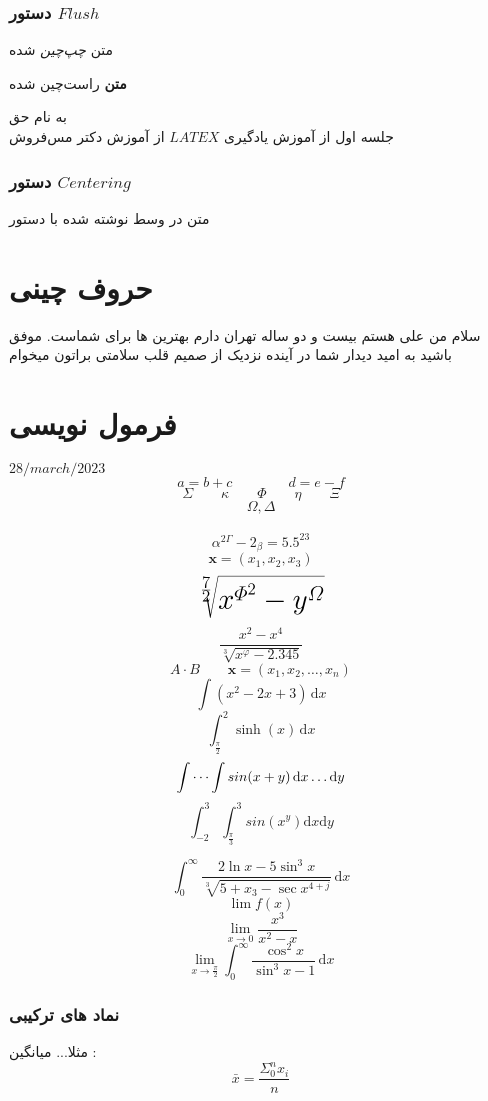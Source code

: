 \documentclass[12pt]{book}
\begin{document}
\subsection{دستور $Flush$}
\begin{flushleft}
	متن \textit{چپ‌چین} شده
\end{flushleft}

\begin{flushright}
	\textbf{متن} راست‌چین شده
\end{flushright}

به نام حق \\
جلسه اول از آموزش یادگیری $LATEX$ از آموزش دکتر مس‌فروش

\subsection{دستور $Centering$}
\centering
متن در وسط نوشته شده با دستور 

\chapter{حروف چینی}\label{chap3}
\begin{multicols}{2}
	
	\shapepar{\hexagonshape}
سلام من علی هستم بیست و دو ساله تهران دارم بهترین ها برای شماست. موفق باشید به امید دیدار شما در آینده نزدیک از صمیم قلب سلامتی براتون میخوام
\end{multicols}
\chapter{فرمول نویسی}\label{chap4}

$28 /march/ 2023$
\[
a = b + c \qquad \qquad d  = e - f 
\]
\[
\Sigma \qquad \kappa \qquad \Phi \qquad \eta \qquad \Xi
\]
\[
\boldsymbol{\varOmega, \varDelta}
\]
\\
\[
\alpha^{2\varGamma} - 2_{\beta} = 5.5^{23}
\]
\[
\mathbf{x} = (x_1,x_2,x_3)
\]
\[
\huge{\sqrt[\frac72]{x^{\varPhi^{2}} - y^\varOmega}}
\]
\[
\frac{x^2 - x^4}{\sqrt[3]{x^\varphi - 2.345}}
\]
\[
A \cdot B \qquad \mathbf{x} = (x_1,x_2,\dots,x_n)
\]
\[
\int (x^2 - 2x + 3) \, \mathrm{d}x
\]
\[
\int_{\tfrac{\pi}2}^{2} \sinh(x) \, \mathrm{d}x
\]
\[
\idotsint sin(x+y) \, \mathrm{d}x \dots \mathrm{d}y
\]
\[
\int_{-2}^{3} \int_{\tfrac{\pi}{3}}^{3} sin(x^y) \mathrm{d}x \mathrm{d}y
\]

\[
\int_{0}^{\infty} \frac{2\ln x - 5\sin^3 x}{\sqrt[3]{5 + x_3 - \sec x^{4+j}}} \, \mathrm{d}x
\]
\[
\lim f(x) 
\]
\[
\lim_{x \to 0} \frac{x^{3}}{x^{2} - x}
\]
\[
\lim_{x \to \tfrac{\pi}{2}} \int_{0}^{\infty} \frac{\cos ^{2}x}{\sin ^{3}x - 1} \, \mathrm{d}x
\]

\begin{flushright}
\subsection{نماد های ترکیبی}
   مثلا... 
   میانگین :
   \[
   \bar{x} = \frac{\Sigma_{0}^{n} x_{i}}{n}
   \]
\end{flushright}
\end{document}
